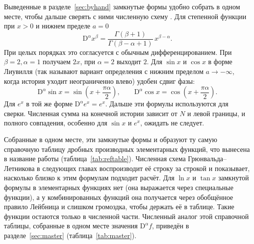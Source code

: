 \documentclass[14pt,a4paper]{extarticle}
\newcommand{\D}{\mathrm{D}}
\begin{document}
Выведенные в разделе~\ref{sec:byhand} замкнутые формы удобно собрать в одном месте, чтобы дальше сверять с ними численную схему \cite{oldham, samko, podlubny}. Для степенной функции при $x>0$ и нижнем пределе $a=0$
\begin{equation}
\D^{\alpha}x^{\beta}=\frac{\Gamma(\beta+1)}{\Gamma(\beta-\alpha+1)}\,x^{\beta-\alpha}.
\label{eq:power}
\end{equation}
При целых порядках это согласуется с обычным дифференцированием. При $\beta=2,\alpha=1$ получаем $2x$, при $\alpha=2$ выходит $2$. Для $\sin x$ и $\cos x$ в форме Лиувилля (так называют вариант определения с нижним пределом $a\to-\infty$, когда история уходит неограниченно влево) удобен сдвиг фазы:
\begin{equation}
\D^{\alpha}\sin x=\sin\!\left(x+\frac{\pi\alpha}{2}\right),\qquad \D^{\alpha}\cos x=\cos\!\left(x+\frac{\pi\alpha}{2}\right).
\label{eq:trig}
\end{equation}
Для $e^x$ в той же форме $\D^{\alpha}e^x=e^x$. Дальше эти формулы используются для сверки. Численная сумма на конечной истории зависит от $N$ и левой границы, и полного совпадения, особенно для $\sin x$ и $e^x$, ожидать не следует.

Собранные в одном месте, эти замкнутые формы и образуют ту самую справочную таблицу дробных производных элементарных функций, что вынесена в название работы (таблица~\ref{tab:reftable}). Численная схема Грюнвальда--Летникова в следующих главах воспроизводит её строку за строкой и показывает, насколько близко к этим формулам подходит расчёт. Для $\ln x$ и $\tan x$ замкнутой формулы в элементарных функциях нет (она выражается через специальные функции), а у комбинированных функций она получается через обобщённое правило Лейбница и слишком громоздка, чтобы держать её в таблице. Такие функции остаются только в численной части. Численный аналог этой справочной таблицы, собранные в одном месте значения $\D^{\alpha}f$, приведён в разделе~\ref{sec:master} (таблица~\ref{tab:master}).
\end{document}
